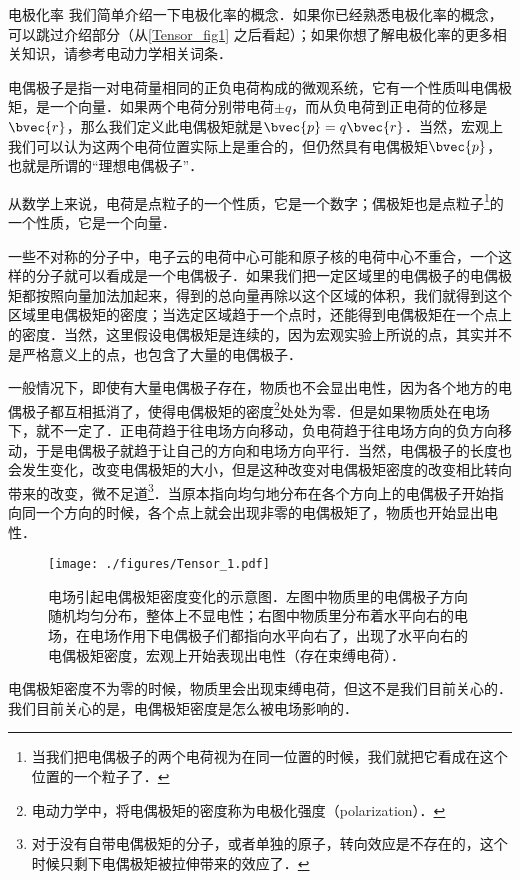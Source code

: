 \begin{example}{电极化率}
我们简单介绍一下电极化率的概念．如果你已经熟悉电极化率的概念，可以跳过介绍部分（从\autoref{Tensor_fig1} 之后看起）；如果你想了解电极化率的更多相关知识，请参考电动力学相关词条．

电偶极子是指一对电荷量相同的正负电荷构成的微观系统，它有一个性质叫电偶极矩，是一个向量．如果两个电荷分别带电荷$\pm q$，而从负电荷到正电荷的位移是$\bvec{r}$，那么我们定义此电偶极矩就是$\bvec{p}=q\bvec{r}$．当然，宏观上我们可以认为这两个电荷位置实际上是重合的，但仍然具有电偶极矩$\bvec{p}$，也就是所谓的“理想电偶极子”．

从数学上来说，电荷是点粒子的一个性质，它是一个数字；偶极矩也是点粒子\footnote{当我们把电偶极子的两个电荷视为在同一位置的时候，我们就把它看成在这个位置的一个粒子了．}的一个性质，它是一个向量．

一些不对称的分子中，电子云的电荷中心可能和原子核的电荷中心不重合，一个这样的分子就可以看成是一个电偶极子．如果我们把一定区域里的电偶极子的电偶极矩都按照向量加法加起来，得到的总向量再除以这个区域的体积，我们就得到这个区域里电偶极矩的密度；当选定区域趋于一个点时，还能得到电偶极矩在一个点上的密度．当然，这里假设电偶极矩是连续的，因为宏观实验上所说的点，其实并不是严格意义上的点，也包含了大量的电偶极子．

一般情况下，即使有大量电偶极子存在，物质也不会显出电性，因为各个地方的电偶极子都互相抵消了，使得电偶极矩的密度\footnote{电动力学中，将电偶极矩的密度称为电极化强度（polarization）．}处处为零．但是如果物质处在电场下，就不一定了．正电荷趋于往电场方向移动，负电荷趋于往电场方向的负方向移动，于是电偶极子就趋于让自己的方向和电场方向平行．当然，电偶极子的长度也会发生变化，改变电偶极矩的大小，但是这种改变对电偶极矩密度的改变相比转向带来的改变，微不足道\footnote{对于没有自带电偶极矩的分子，或者单独的原子，转向效应是不存在的，这个时候只剩下电偶极矩被拉伸带来的效应了．}．当原本指向均匀地分布在各个方向上的电偶极子开始指向同一个方向的时候，各个点上就会出现非零的电偶极矩了，物质也开始显出电性．

\begin{figure}[ht]
\centering
\texttt{[image: ./figures/Tensor\_1.pdf]}
\caption{电场引起电偶极矩密度变化的示意图．左图中物质里的电偶极子方向随机均匀分布，整体上不显电性；右图中物质里分布着水平向右的电场，在电场作用下电偶极子们都指向水平向右了，出现了水平向右的电偶极矩密度，宏观上开始表现出电性（存在束缚电荷）．} \label{Tensor_fig1}
\end{figure}


电偶极矩密度不为零的时候，物质里会出现束缚电荷，但这不是我们目前关心的．我们目前关心的是，电偶极矩密度是怎么被电场影响的．


\end{example}
